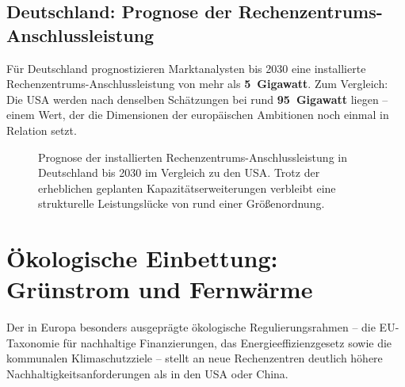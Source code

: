 \documentclass[12pt, a4paper, openany]{report}
\begin{document}
\subsection{Deutschland: Prognose der Rechenzentrums-Anschluss\-leistung}

Für Deutschland prognostizieren Marktanalysten bis 2030 eine installierte
Rechenzentrums-Anschlussleistung von mehr als \textbf{5~Gigawatt}. Zum
Vergleich: Die USA werden nach denselben Schätzungen bei rund
\textbf{95~Gigawatt} liegen -- einem Wert, der die Dimensionen der
europäischen Ambitionen noch einmal in Relation setzt.

\begin{figure}[H]
	\centering
	\caption{Prognose der installierten Rechenzentrums-Anschlussleistung
		in Deutschland bis 2030 im Vergleich zu den USA. Trotz der erheblichen
		geplanten Kapazitätserweiterungen verbleibt eine strukturelle
		Leistungslücke von rund einer Größenordnung.}
	\label{fig:rz_prognose_de}
\end{figure}

\section{Ökologische Einbettung: Grünstrom und Fernwärme}
\label{sec:oekologie}

Der in Europa besonders ausgeprägte ökologische Regulierungsrahmen -- die
EU-Taxonomie für nachhaltige Finanzierungen, das Energieeffizienzgesetz sowie
die kommunalen Klimaschutzziele -- stellt an neue Rechenzentren deutlich
höhere Nachhaltigkeitsanforderungen als in den USA oder China.
\end{document}

